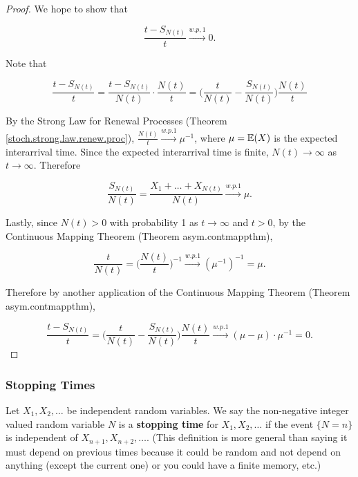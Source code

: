 \begin{proof}

We hope to show that

\[
\frac{ t - S_{N(t)}}{t} \xrightarrow{w.p,1} 0 .
\]

Note that

\[
\frac{ t - S_{N(t)}}{t}  = \frac{ t - S_{N(t)}}{N(t)}  \cdot \frac{ N(t)}{t} =  \bigg(  \frac{ t}{N(t)} -  \frac{S_{N(t)}}{N(t)}     \bigg) \frac{ N(t)}{t} 
\]

By the Strong Law for Renewal Processes (Theorem \ref{stoch.strong.law.renew.proc}), \(\frac{ N(t)}{t} \xrightarrow{w.p.1} \mu^{-1}\), where \(\mu =\E(X)\) is the expected interarrival time. Since the expected interarrival time is finite, \(N(t) \to \infty\) as \(t \to \infty\). Therefore

\[
 \frac{S_{N(t)}}{N(t)} = \frac{X_1 + \ldots + X_{N(t)}}{N(t)} \xrightarrow{w.p.1} \mu.
\]

Lastly, since \(N(t) > 0 \) with probability 1 as \(t \to \infty\) and \(t > 0\), by the Continuous Mapping Theorem (Theorem {asym.contmappthm}),

\[
\frac{ t}{N(t)} =  \bigg( \frac{ N(t)}{t} \bigg)^{-1}  \xrightarrow{w.p.1} (\mu^{-1})^{-1} = \mu.
\]

Therefore by another application of the Continuous Mapping Theorem (Theorem {asym.contmappthm}),

\[
\frac{ t - S_{N(t)}}{t} = \bigg(  \frac{ t}{N(t)} -  \frac{S_{N(t)}}{N(t)}     \bigg) \frac{ N(t)}{t}  \xrightarrow{w.p.1} ( \mu - \mu) \cdot \mu^{-1} = 0.
\]

\end{proof}

\subsubsection{Stopping Times}

\begin{definition} Let \(X_1, X_2, \ldots\) be independent random variables. We say the non-negative integer valued random variable \(N\) is a \textbf{stopping time} for \(X_1, X_2, \ldots\) if the event \(\{ N = n\}\) is independent of \(X_{n+1}, X_{n+2}, \ldots\). (This definition is more general than saying it must depend on previous times because it could be random and not depend on anything (except the current one) or you could have a finite memory, etc.)

\end{definition}

